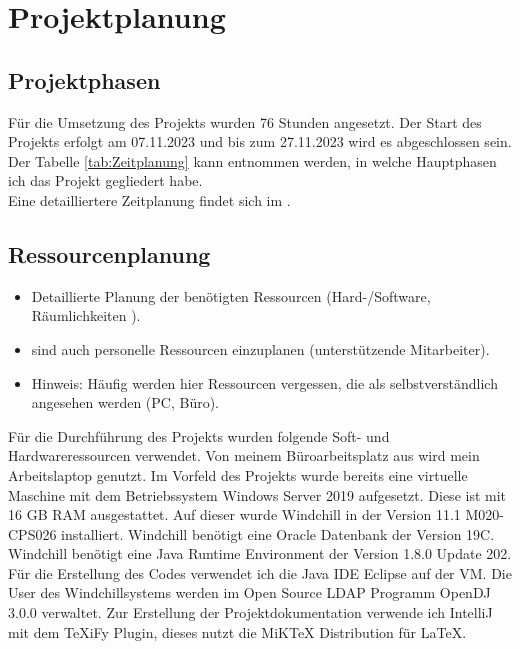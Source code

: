 \section{Projektplanung} 
\label{sec:Projektplanung}


\subsection{Projektphasen}
\label{sec:Projektphasen}

Für die Umsetzung des Projekts wurden 76 Stunden angesetzt.
Der Start des Projekts erfolgt am 07.11.2023 und bis zum 27.11.2023 wird es abgeschlossen sein.
Der Tabelle \ref{tab:Zeitplanung} kann entnommen werden, in welche Hauptphasen ich das Projekt gegliedert habe.
\\
Eine detailliertere Zeitplanung findet sich im .


\subsection{Ressourcenplanung}
\label{sec:Ressourcenplanung}

\begin{itemize}
	\item Detaillierte Planung der benötigten Ressourcen (Hard-/Software, Räumlichkeiten \usw).
	\item \Ggfs sind auch personelle Ressourcen einzuplanen (\zB unterstützende Mitarbeiter).
	\item Hinweis: Häufig werden hier Ressourcen vergessen, die als selbstverständlich angesehen werden (\zB PC, Büro). 
\end{itemize}

Für die Durchführung des Projekts wurden folgende Soft- und Hardwareressourcen verwendet.
Von meinem Büroarbeitsplatz aus wird mein Arbeitslaptop genutzt.
Im Vorfeld des Projekts wurde bereits eine virtuelle Maschine mit dem Betriebssystem Windows Server 2019 aufgesetzt.
Diese ist mit 16 GB RAM ausgestattet.
Auf dieser wurde Windchill in der Version 11.1 M020-CPS026 installiert.
Windchill benötigt eine Oracle Datenbank der Version 19C.
Windchill benötigt eine Java Runtime Environment der Version 1.8.0 Update 202.
Für die Erstellung des Codes verwendet ich die Java IDE Eclipse auf der \acs{VM}.
Die User des Windchillsystems werden im Open Source LDAP Programm OpenDJ 3.0.0 verwaltet.
Zur Erstellung der Projektdokumentation verwende ich IntelliJ mit dem TeXiFy Plugin, dieses nutzt die MiKTeX Distribution für LaTeX.

